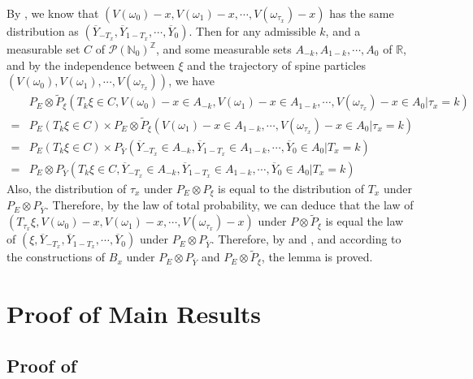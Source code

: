 \documentclass[]{article}
\makeatletter
\numberwithin{equation}{section}
\renewenvironment{proof}[1][\proofname]{%
	\par\pushQED{\qed}\normalfont%
	\topsep6\p@\@plus6\p@\relax
	\trivlist\item[\hskip\labelsep\bfseries#1\@addpunct{.}]%
	\ignorespaces
}{%
	\popQED\endtrivlist\@endpefalse
}
\theoremstyle{thmstyleone}%
\theoremstyle{thmstyletwo}%
\theoremstyle{thmstylethree}%
\theoremstyle{thmstylefour}%
\theoremstyle{thmstylefive}%
\theoremstyle{thmstylesix}%
\newcommand{\R}{\mathbb{R}}
\newcommand{\N}{\mathbb{N}}
\makeatother
\begin{document}
	\begin{proof}[Proof of \Cref{Couping Lemma}]
		By , we know that $\left(V(\omega_0)-x,V(\omega_1)-x,\cdots,V(\omega_{\tau_x})-x\right)$ has the same distribution as $ ( \overline{Y}_{-T_x},\overline{Y}_{1-T_x},\cdots,\overline{Y}_0) $. Then for any admissible $k$, and a measurable set $C$ of $\mathcal{P}(\N_0)^{\mathbb{Z}}$, and some measurable sets $A_{-k},A_{1-k},\cdots,A_0$ of $\R$, 
		and by the independence between $\xi$ and the trajectory of spine particles $\left(V(\omega_0),V(\omega_1),\cdots,V(\omega_{\tau_x})\right)$, we have
		\begin{align}
			&P_E\otimes \tilde{P}_\xi (T_k\xi \in C,V(\omega_0)-x \in A_{-k},V(\omega_1)-x\in A_{1-k},\cdots,V(\omega_{\tau_x})-x\in A_0|\tau_x=k)
			\nonumber\\
			=&
			P_E(T_k\xi \in C)
			\times
			P_E\otimes \tilde{P}_\xi \left(
			V(\omega_1)-x\in A_{1-k},\cdots,V(\omega_{\tau_x})-x\in A_0|\tau_x=k
			\right)
			\nonumber\\
			=&
			P_E(T_k\xi \in C)
			\times
			P_{\overline{Y}}
			\left(
			\overline{Y}_{-T_x}\in A_{-k},\overline{Y}_{1-T_x}\in A_{1-k},\cdots,\overline{Y}_0\in A_0|T_x=k
			\right)
			\nonumber\\
			=&
			P_E\otimes
			P_{\overline{Y}}
			\left(T_k\xi \in C,
			\overline{Y}_{-T_x}\in A_{-k},\overline{Y}_{1-T_x}\in A_{1-k},\cdots,\overline{Y}_0\in A_0|T_x=k
			\right)
		\end{align}
		Also, the distribution of $\tau_x$ under $P_E\otimes P_\xi$ is equal to the distribution of $T_x$ under $P_E\otimes P_{\overline{Y}}$.
		Therefore, by the law of total probability, we can deduce that
		the law of $(T_{\tau_x}\xi,V(\omega_0)-x,V(\omega_1)-x,\cdots,V(\omega_{\tau_x})-x)$ under $P\otimes \tilde{P}_\xi$ is equal
		the law of $(\xi,\overline{Y}_{-T_x},\overline{Y}_{1-T_x},\cdots,\overline{Y}_0)$ under $P_E\otimes P_{\overline{Y}}$.
		Therefore, by  and , and according to the constructions of $B_x$ under $P_E\otimes P_{\overline{Y}}$ and $P_E\otimes \tilde{P}_{\xi}$, the lemma is proved.
	\end{proof}
	
	\section{Proof of Main Results}\label{Section4}
	
	\subsection{Proof of }
	
\end{document}
